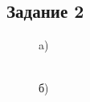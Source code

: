 \documentclass[
11pt,
master, %
subf, %
href, %
colorlinks=true, %
times, %
]{disser}
\begin{document}
\newpage
\subsection*{Задание 2}
\begin{figure}[h]
\begin{minipage}[h]{0.47\linewidth}
 a) \\
\end{minipage}
\hfill
\begin{minipage}[h]{0.47\linewidth}
 \\б)
\end{minipage}
\vfill
\begin{minipage}[h]{0.47\linewidth}

\end{minipage}
\end{figure}
\end{document}
